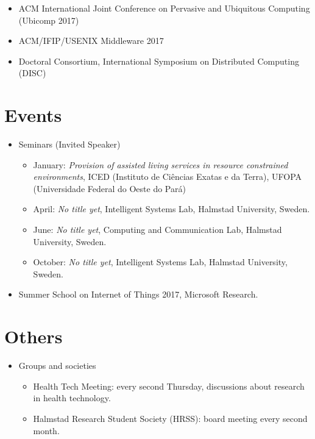 \documentclass[]{article}
\begin{document}
\begin{itemize}
	\item ACM International Joint Conference on Pervasive and Ubiquitous Computing (Ubicomp 2017)
	\item ACM/IFIP/USENIX Middleware 2017
	\item Doctoral Consortium, International Symposium on Distributed Computing (DISC)
\end{itemize}

\section*{Events}

\begin{itemize}
	\item Seminars (Invited Speaker)
		\begin{itemize}
			\item January: \textit{Provision of assisted living services in resource constrained environments}, ICED (Instituto de Ci\^{e}ncias Exatas e da Terra), UFOPA (Universidade Federal do Oeste do Par\'{a})
			\item April: \textit{No title yet}, Intelligent Systems Lab, Halmstad University, Sweden.
			\item June: \textit{No title yet}, Computing and Communication Lab, Halmstad University, Sweden.
			\item October: \textit{No title yet}, Intelligent Systems Lab, Halmstad University, Sweden.			
		\end{itemize}
	\item Summer School on Internet of Things 2017, Microsoft Research.
\end{itemize}

\section*{Others}
	\begin{itemize}
		\item Groups and societies
		\begin{itemize}
			\item Health Tech Meeting: every second Thursday, discussions about research in health technology.
			\item Halmstad Research Student Society (HRSS): board meeting every second month.
		\end{itemize}
	\end{itemize}
\end{document}
